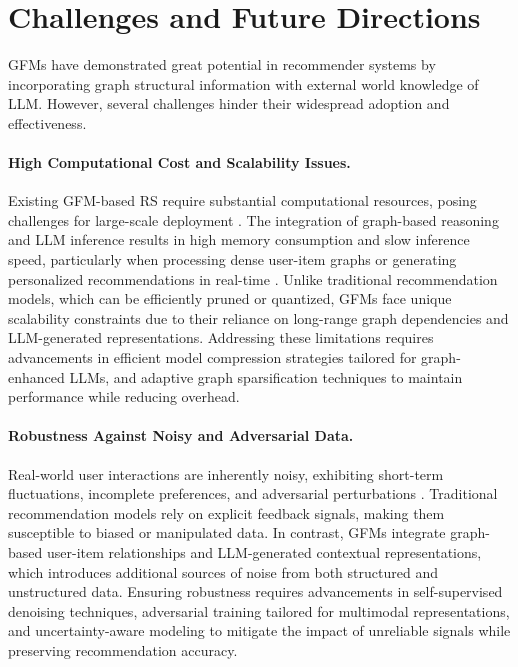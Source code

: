 \section{Challenges and Future Directions}

GFMs have demonstrated great potential in recommender systems by incorporating graph structural information  with external world knowledge of LLM. However, several challenges hinder their widespread adoption and effectiveness.

\paragraph{High Computational Cost and Scalability Issues.}
Existing GFM-based RS require substantial computational resources, posing challenges for large-scale deployment \cite{zhai2024actions}. The integration of graph-based reasoning and LLM inference results in high memory consumption and slow inference speed, particularly when processing dense user-item graphs or generating personalized recommendations in real-time \cite{10.1145/3640457.3688161}. Unlike traditional recommendation models, which can be efficiently pruned or quantized, GFMs face unique scalability constraints due to their reliance on long-range graph dependencies and LLM-generated representations. Addressing these limitations requires advancements in efficient model compression strategies tailored for graph-enhanced LLMs, and adaptive graph sparsification techniques to maintain performance while reducing overhead.

\paragraph{Robustness Against Noisy and Adversarial Data.}
Real-world user interactions are inherently noisy, exhibiting short-term fluctuations, incomplete preferences, and adversarial perturbations \cite{zhang2023robust}. Traditional recommendation models rely on explicit feedback signals, making them susceptible to biased or manipulated data. In contrast, GFMs integrate graph-based user-item relationships and LLM-generated contextual representations, which introduces additional sources of noise from both structured and unstructured data. Ensuring robustness requires advancements in self-supervised denoising techniques, adversarial training tailored for multimodal representations, and uncertainty-aware modeling to mitigate the impact of unreliable signals while preserving recommendation accuracy.

